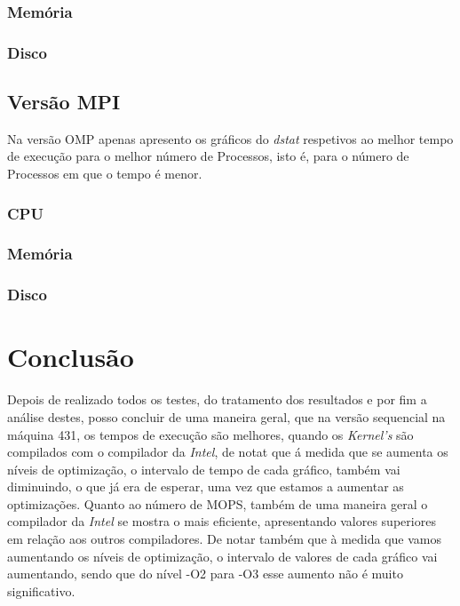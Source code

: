 \documentclass[conference,compsoc]{IEEEtran}
\begin{document}
\subsubsection{Memória}
\subsubsection{Disco}
\subsection{Versão MPI}
Na versão OMP apenas apresento os gráficos do \textit{dstat} respetivos ao melhor tempo de execução para o melhor número de Processos, isto é, para o número de Processos em que o tempo é menor.
\subsubsection{CPU}
\subsubsection{Memória}
\subsubsection{Disco}

\section{Conclusão}
Depois de realizado todos os testes, do tratamento dos resultados e por fim a análise destes, posso concluir de uma maneira geral, que na versão sequencial na máquina 431, os tempos de execução são melhores, quando os \textit{Kernel's} são compilados com o compilador da \textit{Intel}, de notat que á medida que se aumenta os níveis de optimização, o intervalo de tempo de cada gráfico, também vai diminuindo, o que já era de esperar, uma vez que estamos a aumentar as optimizações. Quanto ao número de MOPS, também de uma maneira geral o compilador da \textit{Intel} se mostra o mais eficiente, apresentando valores superiores em relação aos outros compiladores. De notar também que à medida que vamos aumentando os níveis de optimização, o intervalo de valores de cada gráfico vai aumentando, sendo que do nível -O2 para -O3 esse aumento não é muito significativo.
\end{document}
